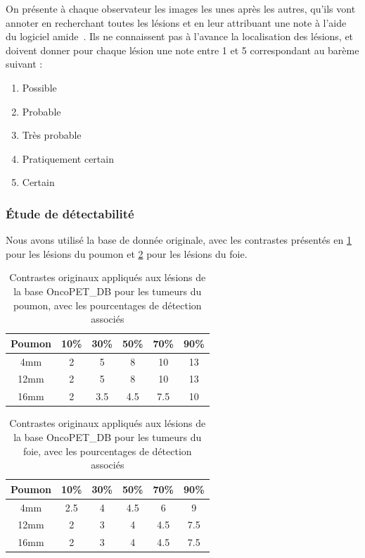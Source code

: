 On présente à chaque observateur les images les unes après les autres, qu'ils vont annoter en recherchant toutes les lésions et en leur attribuant une note à l'aide du logiciel amide~\cite{loening2003amide}. Ils ne connaissent pas à l'avance la localisation des lésions, et doivent donner pour chaque lésion une note entre 1 et 5 correspondant au barème suivant :

\begin{enumerate}
\item Possible
\item Probable
\item Très probable
\item Pratiquement  certain
\item Certain
\end{enumerate}

\subsubsection{Étude de détectabilité}

Nous avons utilisé la base de donnée originale, avec les contrastes présentés en \ref{tab:contrastePoumonOrig} pour les lésions du poumon et \ref{tab:contrasteFoieOrig} pour les lésions du foie.

\begin{table}
\centering
\begin{tabular}{|c||c|c|c|c|c|}
 \hline
Poumon	& 10\% & 30\% & 50\% & 70\% & 90\% \\
\hline
4mm	& 2    &  5   &  8   & 10   & 13   \\
\hline
12mm    & 2    &  5   &  8   & 10   & 13   \\
\hline
16mm    & 2    &  3.5 &  4.5 & 7.5  & 10   \\
\hline
\end{tabular}

\caption[Contraste originaux des lésions du poumon pour létude de détectabilité]{Contrastes originaux appliqués aux lésions de la base OncoPET\_DB pour les tumeurs du poumon, avec les pourcentages de détection associés}
\label{tab:contrastePoumonOrig}
\end{table}

\begin{table}
\centering

\begin{tabular}{|c||c|c|c|c|c|}
 \hline
Poumon	& 10\% & 30\% & 50\% & 70\% & 90\% \\
\hline
4mm	& 2.5    &  4   &  4.5   & 6   & 9   \\
\hline
12mm    & 2    &  3   &  4   & 4.5   & 7.5   \\
\hline
16mm    & 2    &  3   &  4   & 4.5   & 7.5   \\
\hline
\end{tabular}

\caption[Contraste originaux des lésions du foie pour létude de détectabilité]{Contrastes originaux appliqués aux lésions de la base OncoPET\_DB pour les tumeurs du foie, avec les pourcentages de détection associés}
\label{tab:contrasteFoieOrig}
\end{table}

